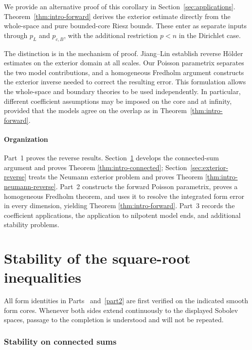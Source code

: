 \documentclass[12pt]{amsart}
\theoremstyle{remark}
\begin{document}
We provide an alternative proof of this corollary in
Section~\ref{sec:applications}. Theorem~\ref{thm:intro-forward}
derives the exterior estimate directly from the whole-space and
pure bounded-core Riesz bounds. These enter as separate inputs
through $p_L$ and $p_{c,B}$, with the additional restriction
$p<n$ in the Dirichlet case.

The distinction is in the mechanism of proof. Jiang--Lin establish
reverse H\"older estimates on the exterior domain at all scales.
Our Poisson parametrix separates the two model contributions,
and a homogeneous Fredholm argument constructs the exterior
inverse needed to correct the resulting error. This formulation
allows the whole-space and boundary theories to be used
independently. In particular, different coefficient assumptions
may be imposed on the core and at infinity, provided that the
models agree on the overlap as in
Theorem~\ref{thm:intro-forward}.

\subsection*{Organization}

Part~1 proves the reverse results.  Section~\ref{sec:connected-stability}
develops the connected-sum argument and proves Theorem
\ref{thm:intro-connected}; Section~\ref{sec:exterior-reverse} treats the
Neumann exterior problem and proves Theorem
\ref{thm:intro-neumann-reverse}.  Part~2 constructs the forward Poisson
parametrix, proves a homogeneous Fredholm theorem, and uses it to resolve
the integrated form error in every dimension, yielding Theorem
\ref{thm:intro-forward}.  Part~3 records the coefficient applications,
the application to nilpotent model ends, and additional stability problems.


\part{Stability of the square-root inequalities}\label{part1}

All form identities in Parts~\ref{part1} and~\ref{part2} are first
verified on the indicated smooth form cores.  Whenever both sides extend
continuously to the displayed Sobolev spaces, passage to the completion is
understood and will not be repeated.

\section{Stability on connected sums}
\label{sec:connected-stability}
\end{document}
